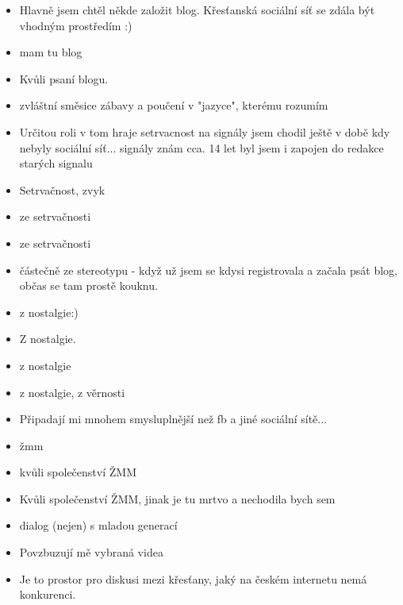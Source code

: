 \begin{itemize}
\item Hlavně jsem chtěl někde založit blog. Křesťanská sociální síť se zdála být vhodným prostředím :)

\item mam tu blog

\item Kvůli psaní blogu.

\item zvláštní směsice zábavy  a poučení v "jazyce", kterému rozumím

\item Určitou roli v tom hraje setrvacnost na signály jsem chodil ještě v době kdy nebyly sociální síť... signály znám cca. 14 let byl jsem i zapojen do redakce starých signalu

\item Setrvačnost, zvyk

\item ze setrvačnosti

\item ze setrvačnosti

\item částečně ze stereotypu - když už jsem se kdysi registrovala a začala psát blog, občas se tam prostě kouknu.

\item z nostalgie:)

\item Z nostalgie.

\item z nostalgie

\item z nostalgie, z věrnosti

\item Připadají mi mnohem smysluplnější než fb a jiné sociální sítě...

\item žmm

\item kvůli společenství ŽMM

\item Kvůli společenství ŽMM, jinak je tu mrtvo a nechodila bych sem

\item dialog (nejen) s mladou generací

\item Povzbuzují mě vybraná videa

\item Je to prostor pro diskusi mezi křesťany, jaký na českém internetu nemá konkurenci.


\end{itemize}
